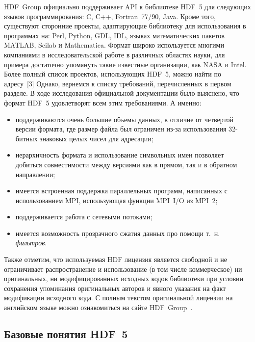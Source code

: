 HDF~Group официально поддерживает API к библиотеке HDF~5 для следующих языков
программирования: C, C++, Fortran~77/90, Java. Кроме того, существуют сторонние
проекты, адаптирующие библиотеку для использования в программах на: Perl,
Python, GDL, IDL, языках математических пакетов MATLAB, Scilab и Mathematica.
Формат широко используется многими компаниями в исследовательской работе
в различных областях науки, для примера достаточно упомянуть такие известные
организации, как NASA и Intel. Более полный список проектов, использующих HDF~5,
можно найти по адресу~[3]
Однако, вернемся к списку требований, перечисленных в первом разделе. В ходе
исследования официальной документации было выяснено, что формат HDF~5
удовлетворят всем этим требованиями. А именно:
\begin{itemize}
\item
поддерживаются очень большие объемы данных, в отличие от четвертой версии
формата, где размер файла был ограничен  из-за использования
32-битных знаковых целых чисел для адресации;

\item
иерархичность формата и использование символьных имен позволяет добиться
совместимости между версиями как в прямом, так и в обратном направлении;

\item
имеется встроенная поддержка параллельных программ, написанных с использованием
MPI, использующая функции MPI~I/O из MPI~2;

\item
поддерживается работа с сетевыми потоками;

\item
имеется возможность прозрачного сжатия данных про помощи т.~н. \emph{фильтров}.
\end{itemize}

Также отметим, что используемая HDF лицензия является свободной
и не ограничивает распространение и использование (в том числе коммерческое)
ни оригинальных, ни модифицированных исходных кодов библиотеки при условии
сохранения упоминания оригинальных авторов и явного указания на факт модификации
исходного кода. С полным текстом оригинальной лицензии на английском языке можно
ознакомиться на сайте HDF~Group~\cite{bib:HdfGroupWebsite}.


\subsection{Базовые понятия HDF~5}


